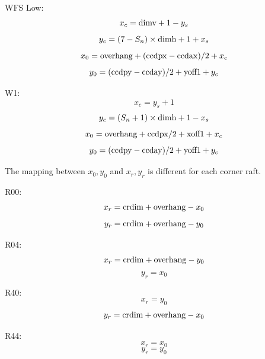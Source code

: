 \documentclass{article}[12pt]
\begin{document}
{WFS Low:
\begin{equation}
x_c = {\rm dimv} + 1 - y_s
\end{equation}
\begin{equation}
y_c = (7 - S_n) \times {\rm dimh} + 1+ x_s
\end{equation}
\begin{equation}
x_0 = {\rm overhang} + ({\rm ccdpx} - {\rm ccdax})/2 + x_c 
\end{equation}
\begin{equation}
y_0 = ({\rm ccdpy} - {\rm ccday})/2 + {\rm yoff1} + y_c
\end{equation}

W1:
\begin{equation}
x_c = y_s + 1
\end{equation}
\begin{equation}
y_c = (S_n  + 1) \times {\rm dimh} + 1 - x_s
\end{equation}
\begin{equation}
x_0 = {\rm overhang} +  {\rm ccdpx}/2 + {\rm xoff1} + x_c
\end{equation}
\begin{equation}
y_0 = ({\rm ccdpy} - {\rm ccday})/2 + {\rm yoff1} + y_c
\end{equation}

The mapping between $x_0, y_0$ and $x_r, y_r$ is different for each corner raft.

R00:
\begin{equation}
x_r = {\rm crdim} + {\rm overhang} - x_0
\end{equation}
\begin{equation}
y_r = {\rm crdim} + {\rm overhang} - y_0
\end{equation}

R04:
\begin{equation}
x_r = {\rm crdim} + {\rm overhang} - y_0
\end{equation}
\begin{equation}
y_r = x_0
\end{equation}

R40:
\begin{equation}
x_r = y_0
\end{equation}
\begin{equation}
y_r = {\rm crdim} + {\rm overhang} - x_0
\end{equation}

R44:
\begin{equation}
x_r = x_0
\end{equation}
\begin{equation}
y_r = y_0
\end{equation}

}
\end{document}
